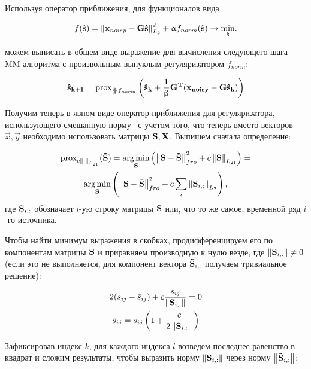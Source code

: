 Используя оператор приближения, для функционалов вида

\begin{equation}
    f(\mathbf{\hat{s}}) = \left\lVert\mathbf{x}_{noisy} - \mathbf{G}\mathbf{\hat{s}}\right\rVert^2_{L_2} + \upalpha f_{norm}(\mathbf{\hat{s}})
    \rightarrow \underset{\mathbf{\hat{s}}}{\min}.
    \label{eq:abstract_reg_func_crit}
\end{equation}

можем выписать в общем виде выражение для вычисления следующего шага
MM-алгоритма с произвольным выпуклым регуляризатором $f_{norm}$:

\begin{equation}
    \mathbf{\hat{s}_{k+1}} =
    \operatorname{prox}_{\frac{\upalpha}{\upbeta} f_{norm}}\left(\mathbf{\hat{s}_k + \frac{1}{\upbeta} G^T(x_{noisy} - G \hat{s}_k)}\right)
    \label{eq:mm_next_iter_prox}
\end{equation}

Получим теперь в явном виде оператор приближения для регуляризатора,
использующего смешанную норму~\cite{gramfort_2012} с учетом того, что теперь
вместо векторов $\vec{x}, \vec{y}$ необходимо использовать матрицы $\mathbf{S},
\mathbf{X}$. Выпишем сначала определение:

\begin{multline*}
    \operatorname{prox}_{c \left\lVert\cdot\right\rVert_{L_{21}}}(\mathbf{\tilde{S}}) =
    \operatorname*{arg\,min}_{\mathbf{S}}\left(\left\lVert\mathbf{S - \tilde{S}}\right\rVert^2_{fro} + c \left\lVert\mathbf{S}\right\rVert_{L_{21}}\right)=\\
    \operatorname*{arg\,min}_{\mathbf{S}}\left(\left\lVert\mathbf{S - \tilde{S}}\right\rVert^2_{fro} + c \sum_i \left\lVert\mathbf{S}_{i,:}\right\rVert_{L_2}\right),
\end{multline*}
где $\mathbf{S}_{i,:}$ обозначает $i$-ую строку матрицы $\mathbf{S}$ или, что то же
самое, временной ряд $i$-го источника.

Чтобы найти минимум выражения в скобках, продифференцируем его по компонентам
матрицы $\mathbf{S}$ и приравняем производную к нулю везде, где $\left\lVert\mathbf{S}_{i,:}\right\rVert \neq 0$
(если это не выполняется, для компонент вектора $\mathbf{\tilde{S}}_{i,:}$ получаем тривиальное решение):

\begin{gather}
    2 (s_{ij} - \tilde{s}_{ij}) + c \frac{s_{ij}}{\left\lVert\mathbf{S}_{i,:}\right\rVert} = 0\\
    \tilde{s}_{ij} = s_{ij} \left(1 + \frac{c}{2\left\lVert\mathbf{S}_{i,:}\right\rVert}\right)
    \label{eq:intermediate_prox_l21}
\end{gather}

Зафиксировав индекс $k$, для каждого индекса $l$ возведем последнее равенство
в квадрат и сложим результаты, чтобы выразить норму $\left\lVert\mathbf{S}_{i,:}\right\rVert$ через норму
$\left\lVert\mathbf{\tilde{S}}_{i,:}\right\rVert$:

